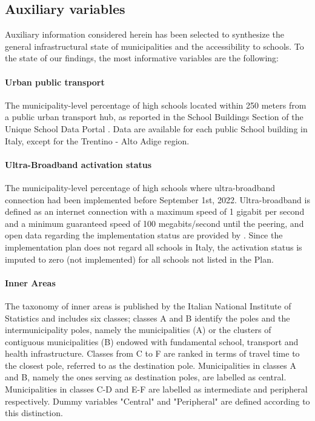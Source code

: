 \documentclass{book}
\begin{document}
\subsection{Auxiliary variables}  \label{Covariates}
Auxiliary information considered herein has been selected to synthesize the general infrastructural state of municipalities and the accessibility to schools. To the state of our findings, the most informative variables are the following:
\paragraph{Urban public transport} The municipality-level percentage of high schools located within 250 meters from a public urban transport hub, as reported in the School Buildings Section of the Unique School Data Portal \citep{MIUR}. Data are available for each public School building in Italy, except for the Trentino - Alto Adige region.  
 
\paragraph{Ultra-Broadband activation status} The municipality-level percentage of high schools where ultra-broadband connection had been implemented before September 1st, 2022. Ultra-broadband is defined as an internet connection with a maximum speed of 1 gigabit per second and a minimum guaranteed speed of 100 megabits/second until the peering, and open data regarding the implementation status are provided by \cite{BB}. Since the implementation plan does not regard all schools in Italy, the activation status is imputed to zero (not implemented) for all schools not listed in the Plan.

\paragraph{Inner Areas}\label{par:inner} The taxonomy of inner areas is published by the Italian National Institute of Statistics \citep{InnerAreas} and includes six classes; classes A and B identify the poles and the intermunicipality poles, namely the municipalities (A) or the clusters of contiguous municipalities (B) endowed with fundamental school, transport and health infrastructure. Classes from C to F are ranked in terms of travel time to the closest pole, referred to as the destination pole. 
Municipalities in classes A and B, namely the ones serving as destination poles, are labelled as central. Municipalities in classes C-D and E-F are labelled as intermediate and peripheral respectively. Dummy variables "Central" and "Peripheral" are defined according to this distinction.
\end{document}
